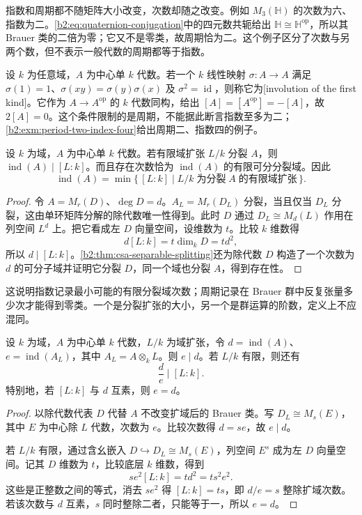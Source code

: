 指数和周期都不随矩阵大小改变，次数却随之改变。例如 \(M_3(\mathbb H)\) 的次数为六、指数为二。\eqref{b2:eq:quaternion-conjugation}中的四元数共轭给出 \(\mathbb H\cong\mathbb H^{\mathrm{op}}\)，所以其 Brauer 类的二倍为零；它又不是零类，故周期恰为二。这个例子区分了次数与另两个数，但不表示一般代数的周期都等于指数。

\ProseParagraphBreak
设 \(k\) 为任意域，\(A\) 为中心单 \(k\) 代数。若一个 \(k\) 线性映射 \(\sigma:A\to A\) 满足 \(\sigma(1)=1\)、\(\sigma(xy)=\sigma(y)\sigma(x)\) 及 \(\sigma^2=\operatorname{id}\)，则称它为[involution of the first kind]。它作为 \(A\to A^{\mathrm{op}}\) 的 \(k\) 代数同构，给出 \([A]=[A^{\mathrm{op}}]=-[A]\)，故 \(2[A]=0\)。这个条件限制的是周期，不能据此断言指数至多为二；\cref{b2:exm:period-two-index-four}给出周期二、指数四的例子。

\begin{proposition}\label{b2:prop:index-splitting-degree}
	设 \(k\) 为域，\(A\) 为中心单 \(k\) 代数。若有限域扩张 \(L/k\) 分裂 \(A\)，则 \(\operatorname{ind}(A)\mid[L:k]\)。而且存在次数恰为 \(\operatorname{ind}(A)\) 的有限可分分裂域。因此
	\[
		\operatorname{ind}(A) =\min\{\,[L:k]\mid L/k\;\text{为分裂}\;A\;\text{的有限域扩张}\,\}.
	\]
\end{proposition}
\begin{proof}
	令 \(A=M_r(D)\)、\(\deg D=d\)。\(A_L=M_r(D_L)\) 分裂，当且仅当 \(D_L\) 分裂，这由单环矩阵分解的除代数唯一性得到。此时 \(D\) 通过 \(D_L\cong M_d(L)\) 作用在列空间 \(L^d\) 上。把它看成左 \(D\) 向量空间，设维数为 \(t\)。比较 \(k\) 维数得
	\[
		d[L:k]=t\dim_kD=td^2,
	\]
	所以 \(d\mid[L:k]\)。\cref{b2:thm:csa-separable-splitting}还为除代数 \(D\) 构造了一个次数为 \(d\) 的可分子域并证明它分裂 \(D\)，同一个域也分裂 \(A\)，得到存在性。
\end{proof}

这说明指数记录最小可能的有限分裂域次数；周期记录在 Brauer 群中反复张量多少次才能得到零类。一个是分裂扩张的大小，另一个是群运算的阶数，定义上不应混同。


\begin{proposition}\label{b2:prop:index-after-base-change}
	设 \(k\) 为域，\(A\) 为中心单 \(k\) 代数，\(L/k\) 为域扩张，令 \(d=\operatorname{ind}(A)\)、\(e=\operatorname{ind}(A_L)\)，其中 \(A_L=A\otimes_kL\)。则 \(e\mid d\)。若 \(L/k\) 有限，则还有
	\[
		\dfrac de\mid[L:k].
	\]
	特别地，若 \([L:k]\) 与 \(d\) 互素，则 \(e=d\)。
\end{proposition}
\begin{proof}
	以除代数代表 \(D\) 代替 \(A\) 不改变扩域后的 Brauer 类。写 \(D_L\cong M_s(E)\)，其中 \(E\) 为中心除 \(L\) 代数，次数为 \(e\)。比较次数得 \(d=se\)，故 \(e\mid d\)。

	若 \(L/k\) 有限，通过含幺嵌入 \(D\hookrightarrow D_L\cong M_s(E)\)，列空间 \(E^s\) 成为左 \(D\) 向量空间。记其 \(D\) 维数为 \(t\)，比较底层 \(k\) 维数，得到
	\[
		s e^2[L:k]=t d^2=t s^2e^2.
	\]
	这些是正整数之间的等式，消去 \(se^2\) 得 \([L:k]=ts\)，即 \(d/e=s\) 整除扩域次数。若该次数与 \(d\) 互素，\(s\) 同时整除二者，只能等于一，所以 \(e=d\)。
\end{proof}
